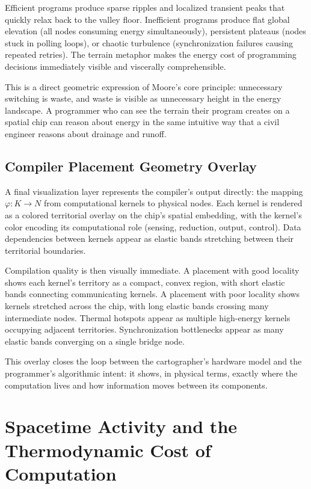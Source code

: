 \documentclass[11pt, a4paper]{article}
\begin{document}
Efficient programs produce sparse ripples and localized transient peaks that
quickly relax back to the valley floor. Inefficient programs produce flat global
elevation (all nodes consuming energy simultaneously), persistent plateaus
(nodes stuck in polling loops), or chaotic turbulence (synchronization failures
causing repeated retries). The terrain metaphor makes the energy cost of
programming decisions immediately visible and viscerally comprehensible.

This is a direct geometric expression of Moore's core principle: unnecessary
switching is waste, and waste is visible as unnecessary height in the energy
landscape. A programmer who can see the terrain their program creates on a
spatial chip can reason about energy in the same intuitive way that a civil
engineer reasons about drainage and runoff.

\subsection{Compiler Placement Geometry Overlay}

A final visualization layer represents the compiler's output directly: the
mapping $\varphi : K \to N$ from computational kernels to physical nodes.
Each kernel is rendered as a colored territorial overlay on the chip's spatial
embedding, with the kernel's color encoding its computational role (sensing,
reduction, output, control). Data dependencies between kernels appear as
elastic bands stretching between their territorial boundaries.

Compilation quality is then visually immediate. A placement with good locality
shows each kernel's territory as a compact, convex region, with short elastic
bands connecting communicating kernels. A placement with poor locality shows
kernels stretched across the chip, with long elastic bands crossing many
intermediate nodes. Thermal hotspots appear as multiple high-energy kernels
occupying adjacent territories. Synchronization bottlenecks appear as many
elastic bands converging on a single bridge node.

This overlay closes the loop between the cartographer's hardware model and the
programmer's algorithmic intent: it shows, in physical terms, exactly where the
computation lives and how information moves between its components.

\section{Spacetime Activity and the Thermodynamic Cost of Computation}
\end{document}

